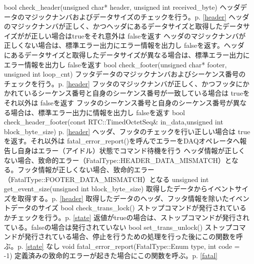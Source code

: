 \documentclass[a4j,10pt,dvips,onecolumn,oneside,final]{jarticle}%
\begin{document}
       {bool check\_header(unsigned char{*} header, unsigned int received\_byte) }
       {ヘッダデータのマジックナンバおよびデータサイズのチェックを行う。p.\pageref{header} \ref{header}}
       {ヘッダのマジックナンバが正しく、かつヘッダにあるデータサイズと取得したデータサイズがが正しい場合はtrueをそれ意外は falseを返す}
       {ヘッダのマジックナンバが正しくない場合は、標準エラー出力にエラー情報を出力し falseを返す。ヘッダにあるデータサイズと取得したデータサイズが異なる場合は、標準エラー出力にエラー情報を出力し falseを返す}
       {bool check\_footer(unsigned char{*} footer, unsigned int loop\_cnt) }
       {フッタデータのマジックナンバおよびシーケンス番号のチェックを行う。p.\pageref{header} \ref{header}}
       {フッタのマジックナンバが正しく、かつフッタにかかれているシーケンス番号と自身のシーケンス番号が一致している場合は trueをそれ以外は falseを返す}
       {フッタのシーケンス番号と自身のシーケンス番号が異なる場合は、標準エラー出力に情報を出力し falseを返す}
       {bool check\_header\_footer(const RTC::TimedOctetSeq\& in\_data,unsigned int block\_byte\_size)}
       {p.\pageref{header} \ref{header}}
       {ヘッダ、フッタのチェックを行い正しい場合は trueを返す。それ以外は fatal\_error\_report()を呼んでエラーをDAQオペレータへ報告し自身はエラー（アイドル）状態でコマンド待機を行う}
       {ヘッダ情報が正しくない場合、致命的エラー（FatalType::HEADER\_DATA\_MISMATCH）となる。フッタ情報が正しくない場合、致命的エラー（FatalType::FOOTER\_DATA\_MISMATCH）となる}
       {unsigned int get\_event\_size(unsigned int block\_byte\_size) }
       {取得したデータからイベントサイズを取得する。p.\pageref{header} \ref{header}}
       {取得したデータのヘッダ、フッタ情報を除いたイベントデータのサイズ}
       {}
       {bool check\_trans\_lock() }
       {ストップコマンドが発行されているかチェックを行う。p.\pageref{state} \ref{state}}
       {返値がtrueの場合は、ストップコマンドが発行されている。falseの場合は発行されていない}
       {}
       {bool set\_trans\_unlock() }
       {ストップコマンドが発行されている場合、停止を行うための処理を行った後にこの関数を呼ぶ。p.\pageref{state} \ref{state}}
       {なし}
       {}
       {void fatal\_error\_report(FatalType::Enum type, int code = -1) }
       {定義済みの致命的エラーが起きた場合にこの関数を呼ぶ。p.\pageref{fatal} \ref{fatal}}
\end{document}
